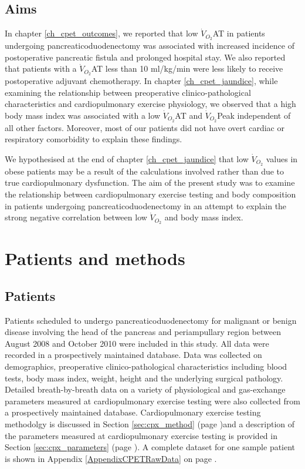 \subsection{Aims}
In chapter \ref{ch_cpet_outcomes}, we reported that low $\dot{V}_{O_2}$AT in patients undergoing pancreaticoduodenectomy was associated with increased incidence of postoperative pancreatic fistula and prolonged hospital stay. 
We also reported that patients with a $\dot{V}_{O_2}$AT less than 10 ml/kg/min were less likely to receive postoperative adjuvant chemotherapy.
In chapter \ref{ch_cpet_jaundice}, while examining the relationship between preoperative clinico-pathological characteristics and cardiopulmonary exercise physiology, we observed that a high body mass index was associated with a low $\dot{V}_{O_2}$AT and $\dot{V}_{O_2}$Peak independent of all other factors. 
Moreover, most of our patients did not have overt cardiac or respiratory comorbidity to explain these findings.

We hypothesised at the end of chapter \ref{ch_cpet_jaundice} that low $\dot{V}_{O_2}$ values in obese patients may be a result of the calculations involved rather than due to true cardiopulmonary dysfunction. 
The aim of the present study was to examine the relationship between cardiopulmonary exercise testing and body composition in patients undergoing pancreaticoduodenectomy in an attempt to explain the strong negative correlation between low $\dot{V}_{O_2}$ and body mass index.

\clearpage
\section{Patients and methods}

\subsection{Patients}
Patients scheduled to undergo pancreaticoduodenectomy for malignant or benign disease involving the head of the pancreas and periampullary region between August 2008 and October 2010 were included in this study. 
All data were recorded in a prospectively maintained database. 
Data was collected on demographics, preoperative clinico-pathological characteristics including blood tests, body mass index, weight, height and the underlying surgical pathology. 
Detailed breath-by-breath data on a variety of physiological and gas-exchange parameters measured at cardiopulmonary exercise testing were also collected from a prospectively maintained database. 
Cardiopulmonary exercise testing methodolgy is discussed in Section \ref{sec:cpx_method} (page \pageref{sec:cpx_parameters})and a description of the parameters measured at cardiopulmonary exercise testing is provided in Section \ref{sec:cpx_parameters} (page \pageref{sec:cpx_parameters}). A complete dataset for one sample patient is shown in Appendix \ref{AppendixCPETRawData} on page \pageref{AppendixCPETRawData}.

